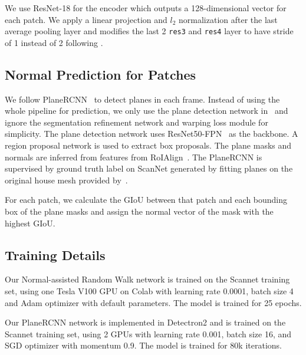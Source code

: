  \par {}
We use ResNet-18 \cite{he2016deep} for the encoder which outputs a 128-dimensional vector for each patch. We apply a linear projection and $l_2$ normalization after the last average pooling layer and modifies the last 2 \texttt{res3} and \texttt{res4} layer to have stride of 1 instead of 2 following \cite{jabri2020walk}.



\subsection{Normal Prediction for Patches \label{normal}}
\par {} We follow PlaneRCNN~\cite{liu2019planercnn} to detect planes in each frame. Instead of using the whole pipeline for prediction, we only use the plane detection network in~\cite{liu2019planercnn} and ignore the segmentation refinement network and warping loss module for simplicity. 
The plane detection network uses ResNet50-FPN~\cite{lin2017feature} as the backbone.
A region proposal network is used to extract box proposals. The plane masks and normals are inferred from features from RoIAlign~\cite{he2017mask}. The PlaneRCNN is supervised by ground truth label on ScanNet generated by fitting planes on the original house mesh provided by~\cite{liu2018planenet}. 
\par {} For each patch, we calculate the GIoU \cite{Rezatofighi_2018_CVPR} between that patch and each bounding box of the plane masks and assign the normal vector of the mask with the highest GIoU. %



\subsection{Training Details}
Our Normal-assisted Random Walk network is trained on the Scannet training set, using one Tesla V100 GPU on Colab with learning rate 0.0001, batch size 4 and Adam optimizer with default parameters. The model is trained for 25 epochs. 

Our PlaneRCNN network is implemented in Detectron2 and is trained on the Scannet training set, using 2 GPUs with learning rate 0.001, batch size 16, and SGD optimizer with momentum 0.9. The model is trained for 80k iterations.
